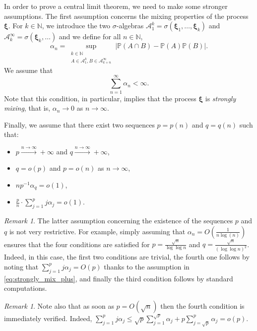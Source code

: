 \documentclass[11pt,a4paper,oneside]{article}
\theoremstyle{definition}
\theoremstyle{remark}
\newtheorem{rem}[thm]{Remark}
\def\N{\mathbb{N}}
\def\P{\mathbb{P}}
\begin{document}
In order to prove a central limit theorem, we need to make some stronger assumptions. The first assumption concerns the mixing properties of the process $\bm \xi$. For $k \in \mathbb{N}$, we introduce the two $\sigma$-algebras $\mathcal{A}_1^{k} = \sigma \left(\bm \xi_1, \dots, \bm \xi_k \right)$ and $\mathcal{A}_k^{\infty} = \sigma \left(\bm \xi_k, \dots \right)$ and we define for all $n\in\N$,
\begin{equation}\label{eq:def_alpha_n}
\alpha_n = \sup_{\substack{k \in \mathbb{N}\\ A \in \mathcal{A}_1^{k},B \in \mathcal{A}_{k+n}^{\infty}}} 
\left| \P \left( A \cap B \right) - \P(A)\P(B) \right|.
\end{equation}
We assume that 
\begin{equation}\label{eq:strongly_mix_plus}
\sum_{n=1}^{\infty} \alpha_n < \infty.
\end{equation}
Note that this condition, in particular, implies that the process $\bm \xi$ is \emph{strongly mixing}, that is, $\alpha_n \to 0$ as $n \to \infty$. 

Finally, we assume that there exist two sequences $p=p(n)$ and $q=q(n)$ such that: 
\begin{itemize}
\item  	$p\xrightarrow{n\to\infty} +\infty$ and $q\xrightarrow{n\to\infty} +\infty$,
\item 	$q=o(p)$ and $p=o(n)$ as $n \to \infty$,
\item   $ n p^{-1 } \alpha_q =o(1)$,
\item   $  \frac{p}{n}  \cdot \sum_{j=1}^p j \alpha_j = o(1)$.
\end{itemize}

\begin{rem}
The latter assumption concerning the existence of the sequences $p$ and $q$ is not very restrictive. For example, simply assuming that $\alpha_n = O(\frac{1}{n \log(n)})$ ensures that the four conditions are satisfied for $p=\frac{\sqrt n}{\log \log n}$ and $q=\frac{\sqrt n}{(\log \log n)^2}$. Indeed, in this case, the first two conditions are trivial, the fourth one follows by noting that $\sum_{j=1}^p j \alpha_j=O(p)$ thanks to the assumption in \cref{eq:strongly_mix_plus}, and finally the third condition follows by standard computations.
\end{rem}

\begin{rem}\label{rem:fbkwufobw}
	Note also that as soon as $p= O(\sqrt n)$ then the fourth condition is immediately verified.
	Indeed, $\sum_{j=1}^p j \alpha_j\leq \sqrt p \sum_{j=1}^{\sqrt p}  \alpha_j+p \sum_{j=\sqrt p}^{ p}  \alpha_j =o(p)$.
\end{rem}
\end{document}
